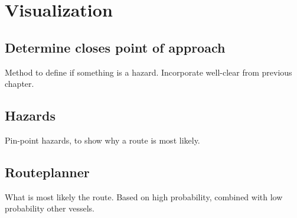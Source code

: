 \chapter{Visualization}

\section{Determine closes point of approach}
Method to define if something is a hazard. Incorporate well-clear from previous chapter.

\section{Hazards}
Pin-point hazards, to show why a route is most likely.

\section{Routeplanner}
What is most likely the route. Based on high probability, combined with low probability other vessels.
